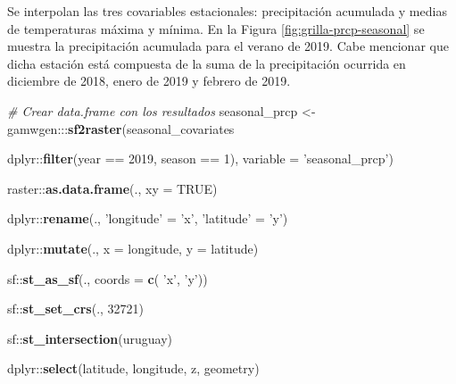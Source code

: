 \documentclass[
  12pt]{article}
\newenvironment{Shaded}{}{}
\newcommand{\CommentTok}[1]{\textcolor[rgb]{0.38,0.63,0.69}{\textit{#1}}}
\newcommand{\DataTypeTok}[1]{\textcolor[rgb]{0.56,0.13,0.00}{#1}}
\newcommand{\DecValTok}[1]{\textcolor[rgb]{0.25,0.63,0.44}{#1}}
\newcommand{\KeywordTok}[1]{\textcolor[rgb]{0.00,0.44,0.13}{\textbf{#1}}}
\newcommand{\NormalTok}[1]{#1}
\newcommand{\OperatorTok}[1]{\textcolor[rgb]{0.40,0.40,0.40}{#1}}
\newcommand{\OtherTok}[1]{\textcolor[rgb]{0.00,0.44,0.13}{#1}}
\newcommand{\StringTok}[1]{\textcolor[rgb]{0.25,0.44,0.63}{#1}}
\begin{document}
Se interpolan las tres covariables estacionales: precipitación acumulada y medias de temperaturas máxima y mínima. En la Figura \ref{fig:grilla-prcp-seasonal} se muestra la precipitación acumulada para el verano de 2019. Cabe mencionar que dicha estación está compuesta de la suma de la precipitación ocurrida en diciembre de 2018, enero de 2019 y febrero de 2019.

\begin{Shaded}
\begin{Highlighting}[]
\CommentTok{# Crear data.frame con los resultados}
\NormalTok{seasonal_prcp <-}\StringTok{ }\NormalTok{gamwgen}\OperatorTok{:::}\KeywordTok{sf2raster}\NormalTok{(seasonal_covariates }\OperatorTok{%
\StringTok{                                       }\NormalTok{dplyr}\OperatorTok{::}\KeywordTok{filter}\NormalTok{(year }\OperatorTok{==}\StringTok{ }\DecValTok{2019}\NormalTok{, season }\OperatorTok{==}\StringTok{ }\DecValTok{1}\NormalTok{),}
                                     \DataTypeTok{variable =} \StringTok{'seasonal_prcp'}\NormalTok{) }\OperatorTok{%
\StringTok{  }\NormalTok{raster}\OperatorTok{::}\KeywordTok{as.data.frame}\NormalTok{(., }\DataTypeTok{xy =} \OtherTok{TRUE}\NormalTok{) }\OperatorTok{%
\StringTok{  }\NormalTok{dplyr}\OperatorTok{::}\KeywordTok{rename}\NormalTok{(., }\StringTok{'longitude'}\NormalTok{ =}\StringTok{ 'x'}\NormalTok{, }\StringTok{'latitude'}\NormalTok{ =}\StringTok{ 'y'}\NormalTok{) }\OperatorTok{%
\StringTok{  }\NormalTok{dplyr}\OperatorTok{::}\KeywordTok{mutate}\NormalTok{(., }\DataTypeTok{x =}\NormalTok{ longitude, }\DataTypeTok{y =}\NormalTok{ latitude) }\OperatorTok{%
\StringTok{  }\NormalTok{sf}\OperatorTok{::}\KeywordTok{st_as_sf}\NormalTok{(., }\DataTypeTok{coords =} \KeywordTok{c}\NormalTok{( }\StringTok{'x'}\NormalTok{, }\StringTok{'y'}\NormalTok{)) }\OperatorTok{%
\StringTok{  }\NormalTok{sf}\OperatorTok{::}\KeywordTok{st_set_crs}\NormalTok{(., }\DecValTok{32721}\NormalTok{)  }\OperatorTok{%
\StringTok{  }\NormalTok{sf}\OperatorTok{::}\KeywordTok{st_intersection}\NormalTok{(uruguay) }\OperatorTok{%
\StringTok{  }\NormalTok{dplyr}\OperatorTok{::}\KeywordTok{select}\NormalTok{(latitude, longitude, z, geometry)  }

}}}}}}}}
\end{Highlighting}
\end{Shaded}
\end{document}
